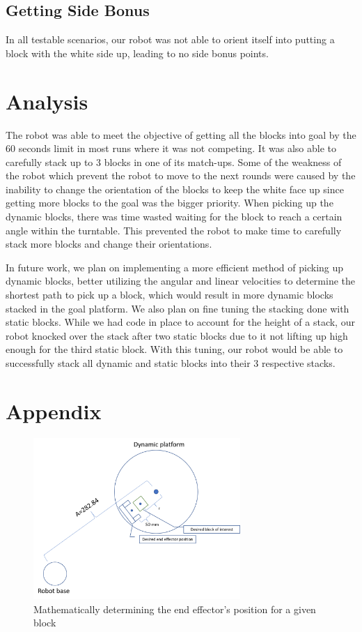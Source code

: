 \documentclass{article}
\begin{document}
     \subsection{Getting Side Bonus}
        In all testable scenarios, our robot was not able to orient itself into putting a block with the white side up, leading to no side bonus points.
 
\section{Analysis}
The robot was able to meet the objective of getting all the blocks into goal by the 60 seconds limit in most runs where it was not competing. It was also able to carefully stack up to 3 blocks in one of its match-ups. Some of the weakness of the robot which prevent the robot to move to the next rounds were caused by the inability to change the orientation of the blocks to keep the white face up since getting more blocks to the goal was the bigger priority. When picking up the dynamic blocks, there was time wasted waiting for the block to reach a certain angle within the turntable. This prevented the robot to make time to carefully stack more blocks and change their orientations. 

In future work, we plan on implementing a more efficient method of picking up dynamic blocks, better utilizing the angular and linear velocities to determine the shortest path to pick up a block, which would result in more dynamic blocks stacked in the goal platform.  We also plan on fine tuning the stacking done with static blocks.  While we had code in place to account for the height of a stack, our robot knocked over the stack after two static blocks due to it not lifting up high enough for the third static block.  With this tuning, our robot would be able to successfully stack all dynamic and static blocks into their 3 respective stacks.


\section{Appendix}

\begin{figure}[h]
\centering
\includegraphics[width=0.7\textwidth]{Dynamic_block_representation.png}
\caption{Mathematically determining the end effector's position for a given block}
\label{dyn2}
\end{figure}
    
\end{document}
